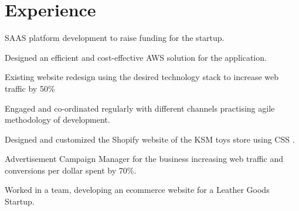 \documentclass[]{deedy-resume-openfont}
\begin{document}
\hfill
\begin{minipage}[t]{0.66\textwidth} 


\section{\color{red}Experience}
\smallskip
{}
\smallskip
{}

\sectionsep


\smallskip
{}
\vspace{\topsep} %
\begin{tightemize}

\item SAAS platform development to raise funding for the startup.
\item Designed an efficient and cost-effective AWS solution for the application. 
\item Existing website redesign using the desired technology stack to increase web traffic by 50\%
\item Engaged and co-ordinated regularly with different channels practising agile methodology of development.
\end{tightemize}
\sectionsep


\begin{tightemize}
\smallskip
\item Designed and customized the Shopify website of the KSM toys store using CSS .\\
\item Advertisement Campaign Manager for the business increasing web traffic and conversions per dollar spent by 70\%.\\
\end{tightemize}
\sectionsep


\begin{tightemize}
\smallskip
\item Worked in a team, developing an ecommerce website for a Leather Goods Startup.


\end{tightemize}
\end{minipage}
\end{document}
